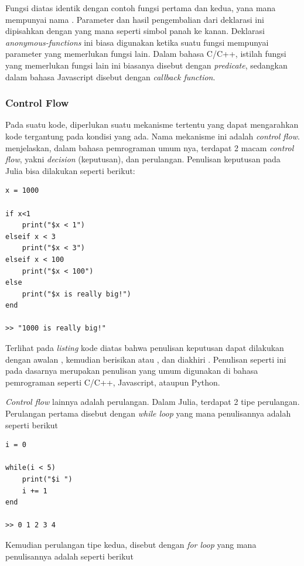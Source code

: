 \noindent
Fungsi diatas identik dengan contoh fungsi pertama dan kedua, yana mana
mempunyai nama . Parameter dan hasil pengembalian dari deklarasi
ini dipisahkan dengan \cw{->} yang mana seperti simbol panah ke kanan. Deklarasi
\emph{anonymous-functions} ini biasa digunakan ketika suatu fungsi mempunyai parameter
yang memerlukan fungsi lain. Dalam bahasa C/C++, istilah fungsi yang memerlukan fungsi
lain ini biasanya disebut dengan \emph{predicate}, sedangkan dalam bahasa Javascript
disebut dengan \emph{callback function}.

\subsubsection{Control Flow}

Pada suatu kode, diperlukan suatu mekanisme tertentu yang dapat mengarahkan kode
tergantung pada kondisi yang ada. Nama mekanisme ini adalah \emph{control flow}.
\cite{amerioControlFlow2019} menjelaskan, dalam bahasa pemrograman umum nya, terdapat
2 macam \emph{control flow}, yakni \emph{decision} (keputusan), dan perulangan.
Penulisan keputusan pada Julia bisa dilakukan seperti berikut:

\begin{lstlisting}
x = 1000

if x<1
    print("$x < 1")
elseif x < 3
    print("$x < 3")
elseif x < 100
    print("$x < 100")
else
    print("$x is really big!")
end

>> "1000 is really big!"
\end{lstlisting}

\noindent
Terlihat pada \emph{listing} kode diatas bahwa penulisan keputusan dapat
dilakukan dengan awalan , kemudian berisikan  atau , dan
diakhiri . Penulisan seperti ini pada dasarnya merupakan penulisan yang umum
digunakan di bahasa pemrograman seperti C/C++, Javascript, ataupun Python.

\emph{Control flow} lainnya adalah perulangan. Dalam Julia, terdapat 2 tipe
perulangan. Perulangan pertama disebut dengan \emph{while loop} yang mana
penulisannya adalah seperti berikut

\begin{lstlisting}
i = 0

while(i < 5)
    print("$i ")
    i += 1
end

>> 0 1 2 3 4
\end{lstlisting}

\noindent
Kemudian perulangan tipe kedua, disebut dengan \emph{for loop} yang mana
penulisannya adalah seperti berikut

